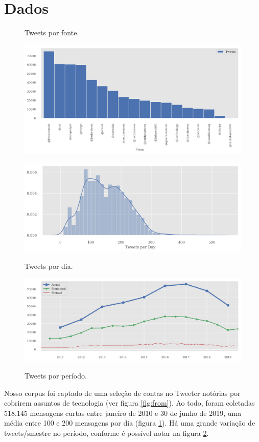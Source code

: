 \documentclass[paper=a4, fontsize=11pt]{scrartcl}
\numberwithin{equation}{section}		%
\numberwithin{figure}{section}			%
\numberwithin{table}{section}				%
\begin{document}
\section{Dados}\label{sec:dados}
\begin{figure}[!h]
  \centering
  \begin{minipage}[t]{0.4\textwidth}
		\caption{Tweets por fonte.}
		\includegraphics[width=\textwidth]{from}
		\label{fig:from}
  \end{minipage}
  \hfill
  \begin{minipage}[t]{0.4\textwidth}
		\caption{Tweets por dia.}
		\includegraphics[width=\textwidth]{perDay}
		\label{fig:daily}
  \end{minipage}
\end{figure}
\begin{figure}[!h]
	\centering
	\caption{Tweets por período.}
	\includegraphics[width=.8\columnwidth]{anual-semestral}
	\label{fig:volume-tweets}
\end{figure}
Nosso corpus foi captado de uma seleção de contas no Tweeter notórias por cobrirem assuntos de tecnologia (ver figura \ref{fig:from}). Ao todo, foram coletadas 518.145 mensagens curtas entre janeiro de 2010 e 30 de junho de 2019, uma média entre 100 e 200 mensagens por dia (figura \ref{fig:daily}).
Há uma grande variação de tweets/smestre no período, conforme é possível notar na figura \ref{fig:volume-tweets}.
\end{document}
